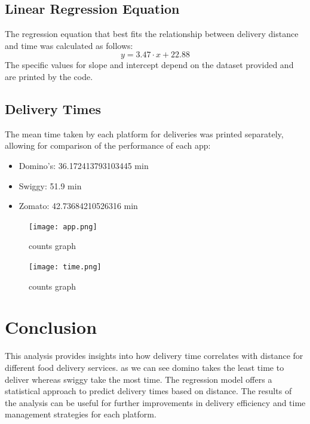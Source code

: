 \documentclass[12pt]{article}
\begin{document}
\subsection*{Linear Regression Equation}
The regression equation that best fits the relationship between delivery distance and time was calculated as follows:
\[
y = \text{3.47} \cdot x + \text{22.88}
\]
The specific values for slope and intercept depend on the dataset provided and are printed by the code.

\subsection*{Delivery Times}
The mean time taken by each platform for deliveries was printed separately, allowing for comparison of the performance of each app:
\begin{itemize}
    \item Domino’s: 36.172413793103445 min
    \item Swiggy: 51.9 min
    \item Zomato: 42.73684210526316 min
\end{itemize}
\begin{figure}[h]
    \centering
    \texttt{[image: app.png]}
    \caption{counts graph}
    \label{fig:label}
\end{figure}
\begin{figure}[h]
    \centering
    \texttt{[image: time.png]}
    \caption{counts graph}
    \label{fig:label}
\end{figure}
\section*{Conclusion}

This analysis provides insights into how delivery time correlates with distance for different food delivery services.
as we can see domino takes the least time to deliver whereas swiggy take the most time.
The regression model offers a statistical approach to predict delivery times based on distance. The results of the analysis can be useful for further improvements in delivery efficiency and time management strategies for each platform.
\end{document}
